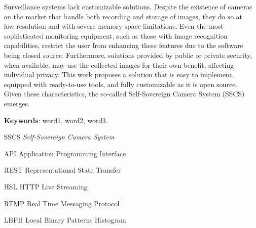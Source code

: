 \documentclass[12pt, %
openright, 
oneside, %
a4paper,    %
brazil]{facom-ufu-abntex2}
\begin{document}
\begin{resumo}[Abstract]

	Surveillance systems lack customizable solutions. Despite the existence of
	cameras on the market that handle both recording and storage of images, they do
	so at low resolution and with severe memory space limitations. Even the most
	sophisticated monitoring equipment, such as those with image recognition
	capabilities, restrict the user from enhancing these features due to the
	software being closed source. Furthermore, solutions provided by public or
	private security, when available, may use the collected images for their own
	benefit, affecting individual privacy. This work proposes a solution that is
	easy to implement, equipped with ready-to-use tools, and fully customizable as
	it is open source. Given these characteristics, the so-called Self-Sovereign
	Camera System (SSCS) emerges.

	\vspace{\onelineskip}
	\noindent
	\textbf{Keywords}: word1, word2, word3.
\end{resumo}

\listoffigures*
\cleardoublepage

\listoftables*
\cleardoublepage

\begin{siglas} %
	\item[SSCS] \textit{\foreignlanguage{english}{Self-Sovereign Camera System}}
	\item[API] Application Programming Interface
	\item[REST] Representational State Transfer
	\item[HSL] HTTP Live Streaming
	\item[RTMP] Real Time Messaging Protocol
	\item[LBPH] Local Binary Patterns Histogram
\end{siglas}

\end{document}
